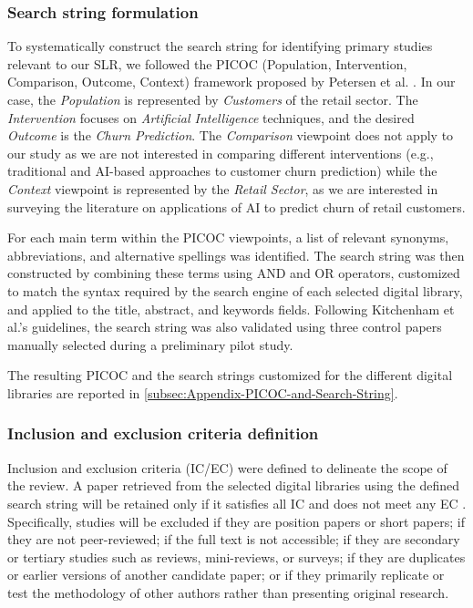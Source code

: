 \documentclass[preprint,12pt]{elsarticle}
\begin{document}
\subsubsection{Search string formulation} 
To systematically construct the search string for identifying primary studies relevant to our SLR, we followed the PICOC (Population, Intervention, Comparison, Outcome, Context) framework proposed by Petersen et al. \cite{PETERSEN20151}. In our case, the \textit{Population} is represented by \textit{Customers} of the retail sector. The \textit{Intervention} focuses on \textit{Artificial Intelligence} techniques, and the desired \textit{Outcome} is the \textit{Churn Prediction}. The \textit{Comparison} viewpoint does not apply to our study as we are not interested in comparing different interventions (e.g., traditional and AI-based approaches to customer churn prediction) while the \textit{Context} viewpoint is represented by the \textit{Retail Sector}, as we are interested in surveying the literature on applications of AI to predict churn of retail customers.

For each main term within the PICOC viewpoints, a list of relevant synonyms, abbreviations, and alternative spellings was identified. The search string was then constructed by combining these terms using AND and OR operators, customized to match the syntax required by the search engine of each selected digital library, and applied to the title, abstract, and keywords fields.
Following Kitchenham et al.'s \cite{Kitchenham-Charters-guidelines} guidelines, the search string was also validated using three control papers \cite{S19-ID363-Agbemadon, S16-ID325-Matuszelanski, S11-D105-Sunarya} manually selected during a preliminary pilot study.

The resulting PICOC and the search strings customized for the different digital libraries are reported in \ref{subsec:Appendix-PICOC-and-Search-String}.


\subsubsection{Inclusion and exclusion criteria definition}  
Inclusion and exclusion criteria (IC/EC) were defined to delineate the scope of the review. 
A paper retrieved from the selected digital libraries using the defined search string will be retained only if it satisfies all IC and does not meet any EC \cite{Kitchenham-Charters-guidelines}. Specifically, studies will be excluded if they are position papers or short papers; if they are not peer-reviewed; if the full text is not accessible; if they are secondary or tertiary studies such as reviews, mini-reviews, or surveys; if they are duplicates or earlier versions of another candidate paper; or if they primarily replicate or test the methodology of other authors rather than presenting original research. 
\end{document}
